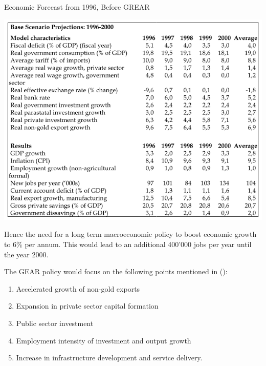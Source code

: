 \documentclass{elsarticle}
\begin{document}
\begin{table}[H]
  \centering
  \caption{Economic Forecast from 1996, Before GREAR}
  \includegraphics[width=1\textwidth]{images/BeforeGEAR.png}
  \cite{GEAR1996}
\end{table}

Hence the need for a long term macroeconomic policy to boost economic growth to 6\% per annum. This would lead to an additional 400’000 jobs per year until the year 2000.

The GEAR policy would focus on the following points mentioned in (\cite{GEAR1996}):
\begin{enumerate}
    \item Accelerated growth of non-gold exports
    \item Expansion in private sector capital formation
    \item Public sector investment
    \item Employment intensity of investment and output growth
    \item Increase in infrastructure development and service delivery. 
\end{enumerate}
\end{document}
